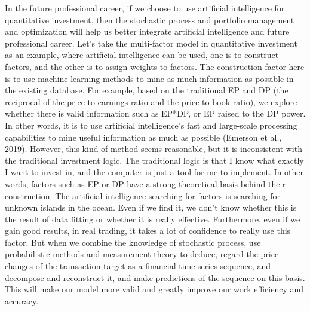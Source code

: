 \documentclass{article}
\begin{document}
    In the future professional career, if we choose to use artificial intelligence for quantitative investment, then the stochastic process and portfolio management and optimization will help us better integrate artificial intelligence and future professional career. Let's take the multi-factor model in quantitative investment as an example, where artificial intelligence can be used, one is to construct factors, and the other is to assign weights to factors. The construction factor here is to use machine learning methods to mine as much information as possible in the existing database. For example, based on the traditional EP and DP (the reciprocal of the price-to-earnings ratio and the price-to-book ratio), we explore whether there is valid information such as EP*DP, or EP raised to the DP power. In other words, it is to use artificial intelligence's fast and large-scale processing capabilities to mine useful information as much as possible (Emerson et al., 2019). However, this kind of method seems reasonable, but it is inconsistent with the traditional investment logic. The traditional logic is that I know what exactly I want to invest in, and the computer is just a tool for me to implement. In other words, factors such as EP or DP have a strong theoretical basis behind their construction. The artificial intelligence searching for factors is searching for unknown islands in the ocean. Even if we find it, we don't know whether this is the result of data fitting or whether it is really effective. Furthermore, even if we gain good results, in real trading, it takes a lot of confidence to really use this factor. But when we combine the knowledge of stochastic process, use probabilistic methods and measurement theory to deduce, regard the price changes of the transaction target as a financial time series sequence, and decompose and reconstruct it, and make predictions of the sequence on this basis. This will make our model more valid and greatly improve our work efficiency and accuracy.\\
    \\
\end{document}

